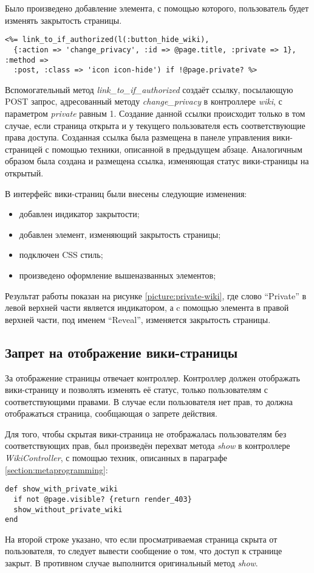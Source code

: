 Было произведено добавление элемента, с помощью которого, пользователь будет
изменять закрытость страницы.
\small{\begin{lstlisting}
<%= link_to_if_authorized(l(:button_hide_wiki),
  {:action => 'change_privacy', :id => @page.title, :private => 1}, :method =>
  :post, :class => 'icon icon-hide') if !@page.private? %>
\end{lstlisting}}
Вспомогательный метод \textit{link\_to\_if\_authorized} создаёт ссылку,
посылающую POST запрос, адресованный методу \textit{change\_privacy} в
контроллере \textit{wiki}, с параметром \textit{private} равным 1. Создание
данной ссылки происходит только в том случае, если страница открыта и у
текущего пользователя есть соответствующие права доступа. Созданная ссылка была
размещена в панеле управления вики-страницей с помощью техники, описанной в
предыдущем абзаце. Аналогичным образом была создана и размещена ссылка,
изменяющая статус вики-страницы на открытый.

В интерфейс вики-страниц были внесены следующие изменения:
\begin{itemize}
  \item добавлен индикатор закрытости;
  \item добавлен элемент, изменяющий закрытость страницы;
  \item подключен CSS стиль;
  \item произведено оформление вышеназванных элементов;
\end{itemize}
Результат работы показан на рисунке \ref{picture:private-wiki}, где слово
``Private'' в левой верхней части является индикатором, а c помощью элемента в
правой верхней части, под именем ``Reveal'', изменяется закрытость страницы.


\subsection{Запрет на отображение вики-страницы}
За отображение страницы отвечает контроллер. Контроллер должен отображать
вики-страницу и позволять изменять её статус, только пользователям с
соответствующими правами. В случае если пользователя нет прав, то должна
отображаться страница, сообщающая о запрете действия.

Для того, чтобы скрытая вики-страница не отображалась пользователям без
соответствующих прав, был произведён перехват метода \textit{show} в
контроллере \textit{WikiController}, с помощью техник, описанных в параграфе
\ref{section:metaprogramming}:
\small{\begin{lstlisting}
def show_with_private_wiki
  if not @page.visible? {return render_403}
  show_without_private_wiki
end
\end{lstlisting}}
На второй строке указано, что если просматриваемая страница скрыта от
пользователя, то следует вывести сообщение о том, что доступ к странице закрыт.
В противном случае выполнится оригинальный метод \textit{show}.

